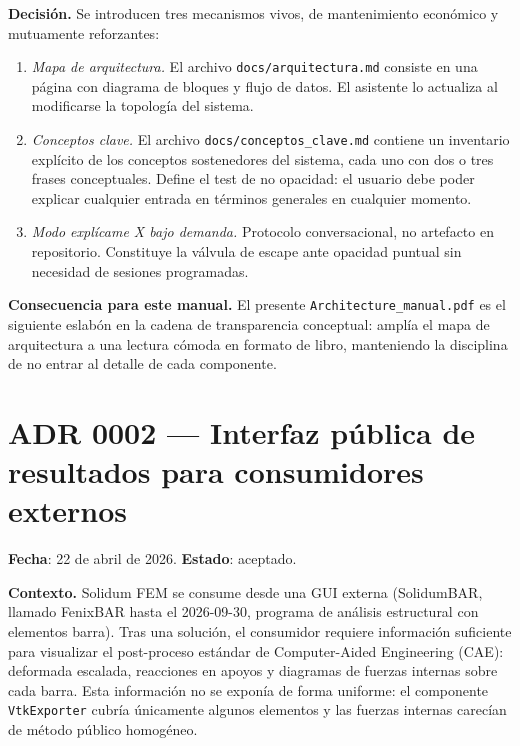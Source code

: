 \documentclass[11pt,oneside]{report}
\begin{document}
\textbf{Decisión.} Se introducen tres mecanismos vivos, de mantenimiento económico y mutuamente reforzantes:

\begin{enumerate}
  \item \textit{Mapa de arquitectura.} El archivo \texttt{docs/\allowbreak{}arquitectura.\allowbreak{}md} consiste en una página con diagrama de bloques y flujo de datos. El asistente lo actualiza al modificarse la topología del sistema.
  \item \textit{Conceptos clave.} El archivo \texttt{docs/\allowbreak{}conceptos\_\allowbreak{}clave.\allowbreak{}md} contiene un inventario explícito de los conceptos sostenedores del sistema, cada uno con dos o tres frases conceptuales. Define el \textquotedbl{}test de no opacidad\textquotedbl{}: el usuario debe poder explicar cualquier entrada en términos generales en cualquier momento.
  \item \textit{Modo \textquotedbl{}explícame X\textquotedbl{} bajo demanda.} Protocolo conversacional, no artefacto en repositorio. Constituye la válvula de escape ante opacidad puntual sin necesidad de sesiones programadas.
\end{enumerate}

\textbf{Consecuencia para este manual.} El presente \texttt{Architecture\_\allowbreak{}manual.\allowbreak{}pdf} es el siguiente eslabón en la cadena de transparencia conceptual: amplía el mapa de arquitectura a una lectura cómoda en formato de libro, manteniendo la disciplina de no entrar al detalle de cada componente.

\section{ADR 0002 --- Interfaz pública de resultados para consumidores externos}
\label{adr:0002}

\textbf{Fecha}: 22 de abril de 2026. \textbf{Estado}: aceptado.

\textbf{Contexto.} Solidum FEM se consume desde una GUI externa (SolidumBAR, llamado FenixBAR hasta el 2026-09-30, programa de análisis estructural con elementos barra). Tras una solución, el consumidor requiere información suficiente para visualizar el post-proceso estándar de Computer-Aided Engineering (CAE): deformada escalada, reacciones en apoyos y diagramas de fuerzas internas sobre cada barra. Esta información no se exponía de forma uniforme: el componente \texttt{VtkExporter} cubría únicamente algunos elementos y las fuerzas internas carecían de método público homogéneo.
\end{document}
